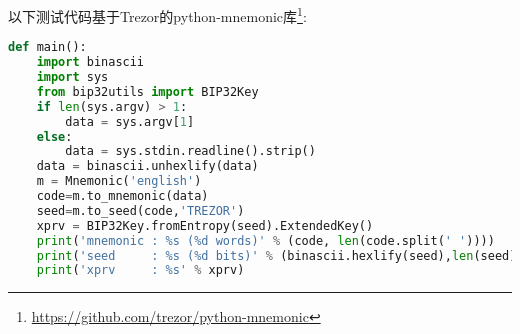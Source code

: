 以下测试代码基于Trezor的python-mnemonic库\footnote{\url{https://github.com/trezor/python-mnemonic}}:

\begin{lstlisting}[language=python]
def main():
    import binascii
    import sys
    from bip32utils import BIP32Key
    if len(sys.argv) > 1:
        data = sys.argv[1]
    else:
        data = sys.stdin.readline().strip()
    data = binascii.unhexlify(data)
    m = Mnemonic('english')
    code=m.to_mnemonic(data)
    seed=m.to_seed(code,'TREZOR')
    xprv = BIP32Key.fromEntropy(seed).ExtendedKey()
    print('mnemonic : %s (%d words)' % (code, len(code.split(' '))))
    print('seed     : %s (%d bits)' % (binascii.hexlify(seed),len(seed) * 4))
    print('xprv     : %s' % xprv)
\end{lstlisting}

